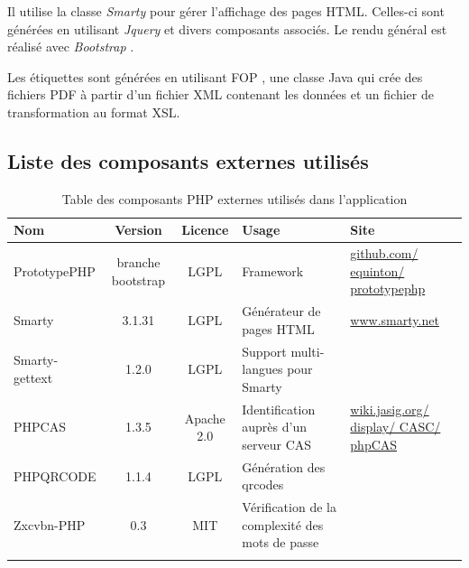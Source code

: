 Il utilise la classe \textit{Smarty} \cite{smarty} pour gérer l'affichage des pages HTML. Celles-ci sont générées en utilisant \textit{Jquery} \cite{jquery}  et divers composants associés. Le rendu général est réalisé avec \textit{Bootstrap} \cite{bootstrap}.

Les étiquettes sont générées en utilisant FOP \cite{fop}, une classe Java qui crée des fichiers PDF à partir d'un fichier XML contenant les données et un fichier de transformation au format XSL.

\subsection{Liste des composants externes utilisés}

\begin{longtable}{|>{\raggedright\arraybackslash}p{3cm}|c|c|>{\raggedright\arraybackslash}p{3cm}|>{\raggedright\arraybackslash}p{3cm}|}
\hline 
\textbf{Nom} & \textbf{Version} & \textbf{Licence} & \textbf{Usage} & \textbf{Site} \\ 
\hline 
\endhead
PrototypePHP & branche bootstrap & LGPL & Framework & \href{https://github.com/equinton/prototypephp}{github.com/ equinton/ prototypephp} \\ 
Smarty & 3.1.31 & LGPL & Générateur de pages HTML & \href{http://www.smarty.net}{www.smarty.net} \\ 
Smarty-gettext & 1.2.0 & LGPL & Support multi-langues pour Smarty & \\
PHPCAS & 1.3.5 & Apache 2.0 & Identification auprès d'un serveur CAS & \href{https://wiki.jasig.org/display/CASC/phpCAS}{wiki.jasig.org/ display/ CASC/ phpCAS} \\ 
PHPQRCODE &  1.1.4 & LGPL & Génération des qrcodes & \\
Zxcvbn-PHP & 0.3 & MIT & Vérification de la complexité des mots de passe & \\

\hline 
\caption{Table des composants PHP externes utilisés dans l'application}
\end{longtable} 

